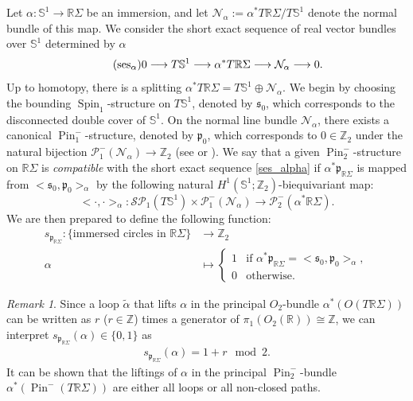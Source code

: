 \documentclass[11pt]{amsart}
\numberwithin{equation}{section}
\theoremstyle{definition}
\theoremstyle{plain}
\theoremstyle{remark}
\newtheorem{remark}[definition]{Remark}
\newcommand{\R}{\mathbb{R}}
\newcommand{\Z}{\mathbb{Z}}
\DeclareMathOperator{\Pin}{Pin}
\DeclareMathOperator{\Spin}{Spin}
\newcommand{\lra}{\longrightarrow}
\begin{document}
Let  $\alpha\colon \mathbb{S}^1\to \R \Sigma$ be an immersion, and let $\mathcal{N}_\alpha:=
\alpha^*T \R \Sigma / T \mathbb{S}^1$ denote the normal bundle of this map. 
We consider the short exact sequence of real vector bundles over $\mathbb{S}^1$ determined by $\alpha$
\begin{equation*}
\tag{${\rm ses}_\alpha$}\label{ses_alpha}
    0\lra T \mathbb{S}^1 \lra \alpha^* T \R \Sigma \lra \mathcal{N}_\alpha \lra 0.
\end{equation*}
Up to homotopy, there is a splitting $\alpha^*T \R \Sigma=T \mathbb{S}^1\oplus \mathcal{N}_\alpha$.  We begin by choosing the bounding $\Spin_1$-structure on $T \mathbb{S}^1$, denoted by $\mathfrak{s}_0$, which corresponds to the disconnected double cover of $\mathbb{S}^1$. On the normal line bundle $\mathcal{N}_\alpha$, there exists a canonical  $\Pin^-_1$-structure, denoted by $\mathfrak{p}_0$, which corresponds to $0 \in \mathbb{Z}_2$ under the natural bijection $\mathcal{P}_1^-(\mathcal{N}_\alpha)\to \Z_2$ (see \cite[Lemma 8.2]{solomon2006intersection} or \cite[Section 11]{chen2024spin}). We say that a given $\Pin^-_2$-structure on $\R \Sigma$ is \textit{compatible} with the short exact sequence \eqref{ses_alpha}  if $\alpha^*\mathfrak{p}_{\R \Sigma}$ is mapped from $<\mathfrak{s}_0,\mathfrak{p}_0>_\alpha$ by the following natural $H^1(\mathbb{S}^1;\Z_2)$-biequivariant map:
$$<\cdot,\cdot>_\alpha\colon  \mathcal{SP}_1(T \mathbb{S}^1)\times \mathcal{P}^-_1(\mathcal{N}_\alpha)\lra \mathcal{P}_2^-(\alpha^*\R \Sigma).$$
 We are then prepared to define the following function:
\begin{align*}
  s_{\mathfrak{p}_{\R \Sigma}}\colon \{ \text{immersed circles in }\R \Sigma \} &\lra \mathbb{Z}_2\\
     \alpha&\longmapsto \begin{cases}
  1& \text{if } \alpha^*\mathfrak{p}_{\R \Sigma}=<\mathfrak{s}_0,\mathfrak{p}_0>_\alpha, \\
  0& \text{otherwise. } 
  \end{cases}
\end{align*}


\begin{remark}
  Since  a loop $\tilde{\alpha}$ that lifts $\alpha$ in the principal $O_2$-bundle $\alpha^*(O(T\R \Sigma))$ 
  can be written as  $r$ ($r\in \Z$) times a generator of $\pi_1(O_2(\R))\cong \Z$, we can interpret $s_{\mathfrak{p}_{\R \Sigma}}(\alpha)\in \{0,1\}$ as 
\begin{align*}
     s_{\mathfrak{p}_{\R \Sigma}}(\alpha)= 1+r \mod 2.
\end{align*}
It can be shown that the liftings of $\alpha$ in the principal $\Pin^-_2$-bundle $\alpha^*(\Pin^-(T\R \Sigma))$ are either all loops or all non-closed paths.
\end{remark}
\end{document}
